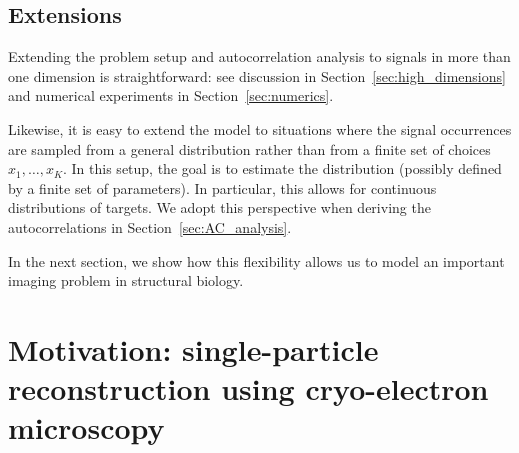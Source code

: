 \documentclass[12pt]{article}
\newcommand{\1}{\mathbf{1}}
\newcommand{\TODO}[1]{{\color{red}{[#1]}}}
\theoremstyle{plain}
\theoremstyle{definition}
\theoremstyle{remark}
\theoremstyle{plain}
\theoremstyle{remark}
\theoremstyle{plain}
\theoremstyle{plain}
\theoremstyle{plain}
\numberwithin{equation}{section}
\begin{document}
 
 
 
\subsection*{Extensions} \label{sec:extensions}

Extending the problem setup and autocorrelation analysis to signals in more than one dimension is straightforward: see discussion in Section~\ref{sec:high_dimensions} and numerical experiments in Section~\ref{sec:numerics}.

Likewise, it is easy to extend the model to situations where the signal occurrences are sampled from a general distribution rather than from a finite set of choices $x_1, \ldots, x_K$. In this setup, the goal is to estimate the distribution (possibly defined by a finite set of parameters). In particular, this allows for continuous distributions of targets. We adopt this perspective when deriving the autocorrelations in Section~\ref{sec:AC_analysis}.

In the next section, we show how this flexibility allows us to model an important imaging problem in structural biology.



\section{Motivation: single-particle reconstruction using cryo-electron microscopy}
\end{document}
